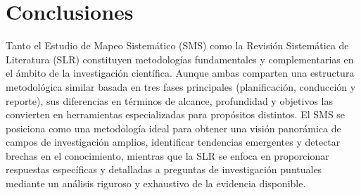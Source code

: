 \section{Conclusiones}
 Tanto el Estudio de Mapeo Sistemático (SMS) como la Revisión Sistemática de Literatura (SLR) constituyen metodologías fundamentales y complementarias en el ámbito de la investigación científica. Aunque ambas comparten una estructura metodológica similar basada en tres fases principales (planificación, conducción y reporte), sus diferencias en términos de alcance, profundidad y objetivos las convierten en herramientas especializadas para propósitos distintos. El SMS se posiciona como una metodología ideal para obtener una visión panorámica de campos de investigación amplios, identificar tendencias emergentes y detectar brechas en el conocimiento, mientras que la SLR se enfoca en proporcionar respuestas específicas y detalladas a preguntas de investigación puntuales mediante un análisis riguroso y exhaustivo de la evidencia disponible.